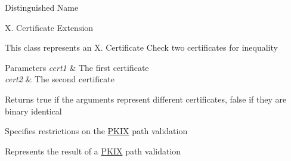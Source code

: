 Distinguished Name

X. Certificate Extension

This class represents an X. Certificate Check two certificates for inequality 
\begin{DoxyParams}{Parameters}
{\em cert1} & The first certificate \\
\hline
{\em cert2} & The second certificate \\
\hline
\end{DoxyParams}
\begin{DoxyReturn}{Returns}
true if the arguments represent different certificates, false if they are binary identical
\end{DoxyReturn}
Specifies restrictions on the \hyperlink{namespace_botan_1_1_p_k_i_x}{P\+K\+IX} path validation

Represents the result of a \hyperlink{namespace_botan_1_1_p_k_i_x}{P\+K\+IX} path validation

